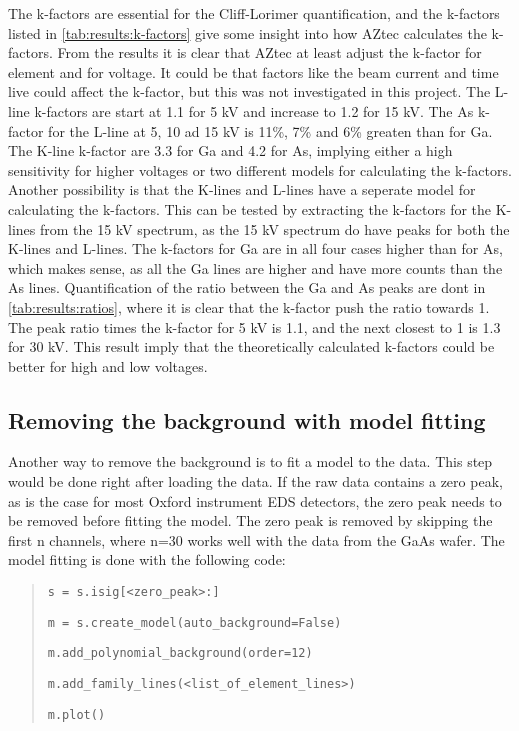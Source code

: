 The k-factors are essential for the Cliff-Lorimer quantification, and the k-factors listed in \cref{tab:results:k-factors} give some insight into how AZtec calculates the k-factors.
From the results it is clear that AZtec at least adjust the k-factor for element and for voltage.
It could be that factors like the beam current and time live could affect the k-factor, but this was not investigated in this project.
The L-line k-factors are start at 1.1 for 5 kV and increase to 1.2 for 15 kV.
The As k-factor for the L-line at 5, 10 ad 15 kV is 11\%, 7\% and 6\% greaten than for Ga.
The K-line k-factor are 3.3 for Ga and 4.2 for As, implying either a high sensitivity for higher voltages or two different models for calculating the k-factors.
Another possibility is that the K-lines and L-lines have a seperate model for calculating the k-factors.
This can be tested by extracting the k-factors for the K-lines from the 15 kV spectrum, as the 15 kV spectrum do have peaks for both the K-lines and L-lines.
The k-factors for Ga are in all four cases higher than for As, which makes sense, as all the Ga lines are higher and have more counts than the As lines.
Quantification of the ratio between the Ga and As peaks are dont in \cref{tab:results:ratios}, where it is clear that the k-factor push the ratio towards 1.
The peak ratio times the k-factor for 5 kV is 1.1, and the next closest to 1 is 1.3 for 30 kV.
This result imply that the theoretically calculated k-factors could be better for high and low voltages.






\subsection{Removing the background with model fitting}
\label{sec:discussion:steps:model_fitting}
Another way to remove the background is to fit a model to the data.
This step would be done right after loading the data.
If the raw data contains a zero peak, as is the case for most Oxford instrument EDS detectors, the zero peak needs to be removed before fitting the model.
The zero peak is removed by skipping the first n channels, where n=30 works well with the data from the GaAs wafer.
The model fitting is done with the following code:

\begin{quote}
    \verb|s = s.isig[<zero_peak>:]|

    \verb|m = s.create_model(auto_background=False)|

    \verb|m.add_polynomial_background(order=12)|

    \verb|m.add_family_lines(<list_of_element_lines>)|

    \verb|m.plot()|

\end{quote}

